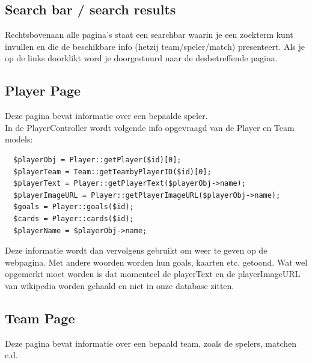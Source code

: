 \documentclass[11pt, a4paper]{article}
\begin{document}
\subsection{Search bar / search results}
Rechtsbovenaan alle pagina's staat een searchbar waarin je een zoekterm kunt invullen en die de beschikbare info (hetzij team/speler/match) presenteert. Als je op de links doorklikt word je doorgestuurd naar de desbetreffende pagina.

\subsection{Player Page}
Deze pagina bevat informatie over een bepaalde speler.
\\
In de PlayerController wordt volgende info opgevraagd van de Player en Team models:
\begin{lstlisting}
  $playerObj = Player::getPlayer($id)[0];
  $playerTeam = Team::getTeambyPlayerID($id)[0];
  $playerText = Player::getPlayerText($playerObj->name);
  $playerImageURL = Player::getPlayerImageURL($playerObj->name);
  $goals = Player::goals($id);
  $cards = Player::cards($id);
  $playerName = $playerObj->name;
\end{lstlisting}

Deze informatie wordt dan vervolgens gebruikt om weer te geven op de webpagina. Met andere woorden worden hun goals, kaarten etc. getoond. Wat wel opgemerkt moet worden is dat momenteel de playerText en de playerImageURL van wikipedia worden gehaald en niet
in onze database zitten.
\subsection{Team Page}
Deze pagina bevat informatie over een bepaald team, zoals de spelers, matchen e.d.
\end{document}

